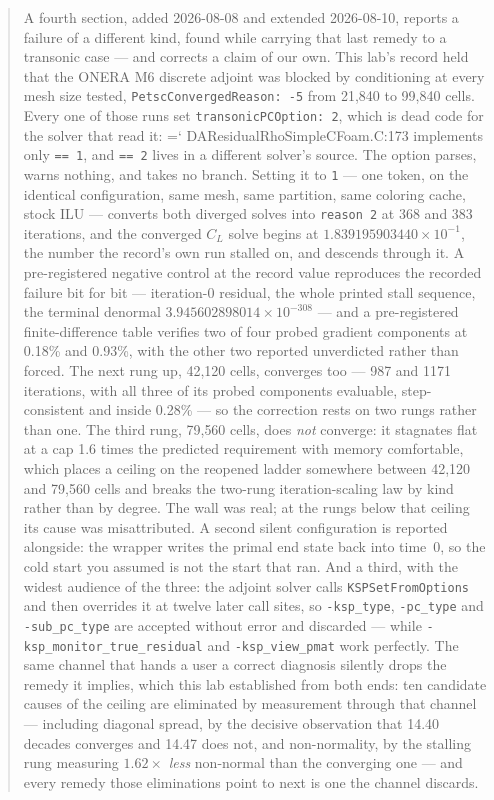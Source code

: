 \documentclass[11pt,a4paper]{article}
\newcommand{\artifact}[1]{{\small\ttfamily\hyphenchar\font=`\-\relax
  \def\_{\textunderscore\allowbreak}#1}}
\begin{document}
\begin{abstract}
A fourth section, added 2026-08-08 and extended 2026-08-10, reports a failure of a different kind, found while
carrying that last remedy to a transonic case --- and corrects a claim of our own. This lab's
record held that the ONERA M6 discrete adjoint was blocked by conditioning at every mesh size
tested, \texttt{PetscConvergedReason: -5} from 21{,}840 to 99{,}840 cells. Every one of those
runs set \texttt{transonicPCOption: 2}, which is dead code for the solver that read it:
\artifact{DAResidualRhoSimpleCFoam.C:173} implements only \texttt{== 1}, and \texttt{== 2}
lives in a different solver's source. The option parses, warns nothing, and takes no branch.
Setting it to \texttt{1} --- one token, on the identical configuration, same mesh, same
partition, same coloring cache, stock ILU --- converts both diverged solves into
\texttt{reason 2} at 368 and 383 iterations, and the converged \(C_L\) solve begins at
\(1.839195903440\times10^{-1}\), the number the record's own run stalled on, and descends
through it. A pre-registered negative control at the record value reproduces the recorded
failure bit for bit --- iteration-0 residual, the whole printed stall sequence, the terminal
denormal \(3.945602898014\times10^{-308}\) --- and a pre-registered finite-difference table
verifies two of four probed gradient components at 0.18\% and 0.93\%, with the other two
reported unverdicted rather than forced. The next rung up, 42{,}120 cells, converges too --- 987
and 1171 iterations, with all three of its probed components evaluable, step-consistent and
inside 0.28\% --- so the correction rests on two rungs rather than one. The third rung,
79{,}560 cells, does \emph{not} converge: it stagnates flat at a cap 1.6 times the predicted
requirement with memory comfortable, which places a ceiling on the reopened ladder somewhere
between 42{,}120 and 79{,}560 cells and breaks the two-rung iteration-scaling law by kind
rather than by degree. The wall was real; at the rungs below that ceiling its cause was
misattributed. A second silent configuration is reported alongside: the
wrapper writes the primal end state back into time~0, so the cold start you assumed is not the
start that ran. And a third, with the widest audience of the three: the adjoint solver calls
\texttt{KSPSetFromOptions} and then overrides it at twelve later call sites, so
\texttt{-ksp\_type}, \texttt{-pc\_type} and \texttt{-sub\_pc\_type} are accepted without
error and discarded --- while \texttt{-ksp\_monitor\_true\_residual} and
\texttt{-ksp\_view\_pmat} work perfectly. The same channel that hands a user a correct
diagnosis silently drops the remedy it implies, which this lab established from both ends:
ten candidate causes of the ceiling are eliminated by measurement through that channel ---
including diagonal spread, by the decisive observation that 14.40 decades converges and 14.47
does not, and non-normality, by the stalling rung measuring \(1.62\times\) \emph{less}
non-normal than the converging one --- and every remedy those eliminations point to next is one
the channel discards.


\end{abstract}
\end{document}
